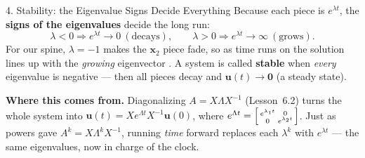 \documentclass[10pt]{article}
\newcommand{\uu}{\mathbf{u}}
\newcommand{\xx}{\mathbf{x}}
\newcommand{\zero}{\mathbf{0}}
\begin{document}
\begin{notesbox}{4. Stability: the Eigenvalue Signs Decide Everything}
Because each piece is $e^{\lambda t}$, the \textbf{signs of the eigenvalues} decide the long run:
\[
  \lambda<0\Rightarrow e^{\lambda t}\to 0\ (\text{decays}),\qquad
  \lambda>0\Rightarrow e^{\lambda t}\to\infty\ (\text{grows}).
\]
For our spine, $\lambda=-1$ makes the $\xx_2$ piece fade, so as time runs on the solution lines up with the
\emph{growing} eigenvector \ans{$\xx_1=\begin{bsmallmatrix}1\\1\end{bsmallmatrix}$}. A system is called \textbf{stable} when \emph{every} eigenvalue is
negative --- then all pieces decay and $\uu(t)\to\zero$ (a steady state).

\vspace{3pt}
\textbf{Where this comes from.} Diagonalizing $A=X\Lambda X^{-1}$ (Lesson~6.2) turns the whole system into
$\uu(t)=Xe^{\Lambda t}X^{-1}\uu(0)$, where $e^{\Lambda t}=\begin{bsmallmatrix}e^{\lambda_1 t}&0\\0&e^{\lambda_2 t}\end{bsmallmatrix}$.
Just as powers gave $A^k=X\Lambda^k X^{-1}$, running \emph{time} forward replaces each $\lambda^k$ with
$e^{\lambda t}$ --- the same eigenvalues, now in charge of the clock.
\end{notesbox}
\end{document}
